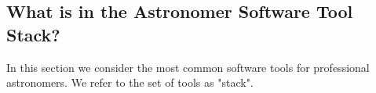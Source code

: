 
\subsection{What is in the Astronomer Software Tool Stack?}

In this section we consider the most common software tools for professional astronomers. We refer to the set of tools as "stack". 